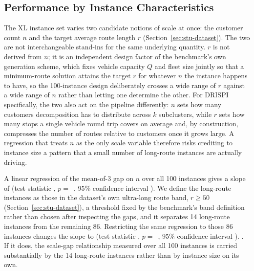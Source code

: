 \subsection{Performance by Instance Characteristics}\label{sec:stu-characteristics}
The XL instance set varies two candidate notions of scale at once: the customer count $n$ and the target average route length $r$ (Section~\ref{sec:stu-dataset}). The two are not interchangeable stand-ins for the same underlying quantity. $r$ is not derived from $n$; it is an independent design factor of the benchmark's own generation scheme, which fixes vehicle capacity $Q$ and fleet size jointly so that a minimum-route solution attains the target $r$ for whatever $n$ the instance happens to have, so the 100-instance design deliberately crosses a wide range of $r$ against a wide range of $n$ rather than letting one determine the other. For DRISPI specifically, the two also act on the pipeline differently: $n$ sets how many customers decomposition has to distribute across $k$ subclusters, while $r$ sets how many stops a single vehicle round trip covers on average and, by construction, compresses the number of routes relative to customers once it grows large. A regression that treats $n$ as the only scale variable therefore risks crediting to instance size a pattern that a small number of long-route instances are actually driving.

A linear regression of the mean-of-3 gap on $n$ over all 100 instances gives a slope of  (test statistic , $p = $~, 95\% confidence interval ). We define the long-route instances as those in the dataset's own ultra-long route band, $r \geq 50$ (Section~\ref{sec:stu-dataset}), a threshold fixed by the benchmark's band definition rather than chosen after inspecting the gaps, and it separates 14 long-route instances from the remaining 86. Restricting the same regression to those 86 instances changes the slope to  (test statistic , $p = $~, 95\% confidence interval ). . If it does, the scale-gap relationship measured over all 100 instances is carried substantially by the 14 long-route instances rather than by instance size on its own.

